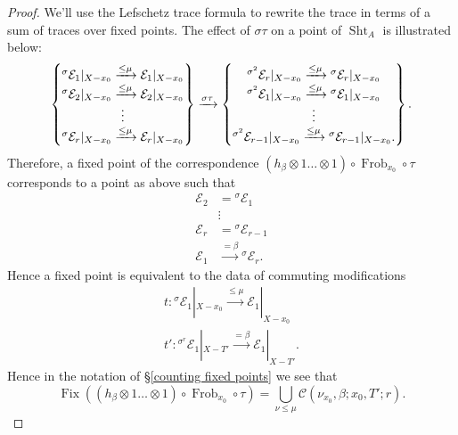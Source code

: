 \documentclass[reqno]{amsart}
\numberwithin{equation}{section}
\newcommand{\Cal}[1]{\mathcal{#1}}
\newcommand{\co}{\colon}
\DeclareMathOperator{\Frob}{Frob}
\DeclareMathOperator{\Fix}{Fix}
\DeclareMathOperator{\Sht}{Sht}
\theoremstyle{remark}
\numberwithin{equation}{section}
\begin{document}
\begin{proof}
We'll use the Lefschetz trace formula to rewrite the trace in terms of a sum of traces over fixed points. The effect of $\sigma \tau$ on a point of $\Sht_A$ is illustrated below: 
\[
\left\{ \begin{array}{@{}c@{}}
{}^{\sigma}\Cal{E}_1|_{X-x_0} \xrightarrow{\leq \mu} \Cal{E}_1|_{X-x_0} \\
{}^{\sigma}\Cal{E}_2|_{X-x_0}\xrightarrow{\leq \mu} \Cal{E}_2|_{X-x_0} \\
 \vdots \\
{}^{\sigma}\Cal{E}_r|_{X-x_0} \xrightarrow{\leq \mu} \Cal{E}_r|_{X-x_0}
\end{array} \right\} \xrightarrow{\sigma \tau} 
\left\{ \begin{array}{@{}c@{}}
{}^{\sigma^2}\Cal{E}_r|_{X-x_0} \xrightarrow{\leq \mu} {}^{\sigma}\Cal{E}_r|_{X-x_0} \\
{}^{\sigma^2}\Cal{E}_1|_{X-x_0} \xrightarrow{\leq \mu} {}^{\sigma}\Cal{E}_1 |_{X-x_0}\\
 \vdots \\
{}^{\sigma^2}\Cal{E}_{r-1}|_{X-x_0} \xrightarrow{\leq \mu} {}^{\sigma}\Cal{E}_{r-1}|_{X-x_0}.
\end{array} \right\}.
\]
Therefore, a fixed point of the correspondence $( h_{\beta} \otimes 1 \ldots \otimes 1 ) \circ \Frob_{x_0} \circ  \tau$ corresponds to a point as above such that
\begin{align*}
\Cal{E}_2 & = {}^{\sigma} \Cal{E}_1 \\
& \vdots  \\
\Cal{E}_r & = {}^{\sigma} \Cal{E}_{r-1} \\
\Cal{E}_{1} &\xrightarrow{=\beta} {}^{\sigma} \Cal{E}_r.
\end{align*}
Hence a fixed point is equivalent to the data of commuting modifications
\begin{align*}
t \co {}^{\sigma} \Cal{E}_1|_{X-x_0} \xrightarrow{\leq \mu} \Cal{E}_1|_{X-x_0} \\
t' \co {}^{\sigma^r} \Cal{E}_1|_{X-T'} \xrightarrow{=\beta} \Cal{E}_1|_{X-T'}.
\end{align*}
Hence in the notation of \S \ref{counting fixed points} we see that 
\[
\Fix(( h_{\beta}\otimes 1 \ldots \otimes 1 ) \circ \Frob_{x_0} \circ  \tau)   = \bigcup_{\nu \leq \mu} \Cal{C}(\nu_{x_0}, \beta; x_0,T'; r).
\]



\end{proof}
\end{document}
